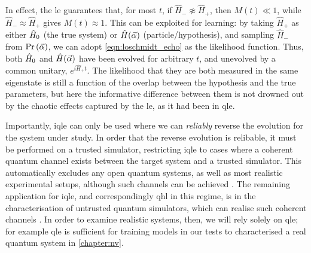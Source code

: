 \par 
In effect, the \gls{le} guarantees that, for most $t$, if $\hat{H}_{-} \not\approx \hat{H}_{+}$, then $M(t) \ll 1$, 
    while $\hat{H}_{-} \approx \hat{H}_{+}$ gives $M(t) \approx 1$. 
This can be exploited for learning: 
    by taking $\hat{H}_{+}$ as either $\hat{H}_0$ (the true system) or $\hat{H}(\vec{\alpha})$ (particle/hypothesis), 
    and sampling $\hat{H}_{-}$ from $\Pr\left(\vec{\alpha}\right)$, 
    we can adopt \cref{eqn:loschmidt_echo} as the \gls{likelihood} function.
Thus, both $\hat{H}_0$ and $\hat{H}(\vec{\alpha})$ have been evolved for arbitrary $t$, and unevolved by a common unitary, $e^{i\hat{H}_+ t}$.
The likelihood that they are both measured in the same eigenstate is still a function of the overlap between the 
    hypothesis and the true parameters, but here the informative difference between them is not drowned out by the chaotic effects captured by the \gls{le},
    as it had been in \gls{qle}.
\par 

Importantly, \gls{iqle} can only be used where we can \emph{reliably} reverse the evolution for the system under study. 
In order that the reverse evolution is relibable, it must be performed on a trusted simulator, 
    restricting \gls{iqle} to cases where a coherent quantum channel exists between the target
    system and a trusted simulator. 
This automatically excludes any open quantum systems, as well as most realistic 
    experimental setups, although such channels can be achieved \cite{hensen2015loophole}. 
The remaining application for \gls{iqle}, and correspondingly \gls{qhl} in this regime, 
    is in the characterisation of untrusted quantum simulators, 
    which can realise such coherent channels \cite{wang2017experimental}. 
In order to examine realistic systems, then, we will rely solely on \gls{qle};
    for example \gls{qle} is sufficient for training models in our tests to characterised
    a real quantum system in \cref{chapter:nv}.
    

